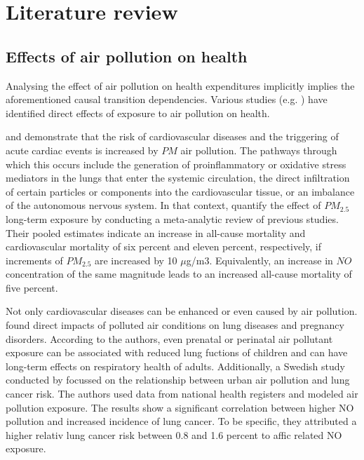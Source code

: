 \documentclass[
]{article}
\begin{document}
	\hypertarget{literature review}{%
		\section{Literature review}\label{Literature review}}
	
	\subsection{Effects of air pollution on health}
	
	Analysing the effect of air pollution on health expenditures implicitly implies the aforementioned causal transition dependencies. Various studies (e.g. \cite{franklin2015air,NYBERG2000,LEL2015}) have identified direct effects of exposure to air pollution on health. 
	
	\cite{franklin2015air} and \cite{fiordelisi2017mechanisms} demonstrate that the risk of cardiovascular diseases and the triggering of acute cardiac events is increased by $PM$ air pollution. The pathways through which this occurs include the generation of proinflammatory or oxidative stress mediators in the lungs that enter the systemic circulation, the direct infiltration of certain particles or components into the cardiovascular tissue, or an imbalance of the autonomous nervous system. In that context, \cite{hoek2013long} quantify the effect of $PM_2.5$ long-term exposure by conducting a meta-analytic review of previous studies. Their pooled estimates indicate an increase in all-cause mortality and cardiovascular mortality of six percent and eleven percent, respectively, if increments of $PM_2.5$ are increased by 10 $\mu$g/m3. Equivalently, an increase in $NO$ concentration of the same magnitude leads to an increased all-cause mortality of five percent.  
	
	Not only cardiovascular diseases can be enhanced or even caused by air pollution. \cite{KIM2018} found direct impacts of polluted air conditions on lung diseases and pregnancy disorders. According to the authors, even prenatal or perinatal air pollutant exposure can be associated with reduced lung fuctions of children and can have long-term effects on respiratory health of adults. Additionally, a Swedish study conducted by \cite{NYBERG2000} focussed on the relationship between urban air pollution and lung cancer risk. The authors used data from national health registers and modeled air pollution exposure. The results show a significant correlation between higher NO pollution and increased incidence of lung cancer. To be specific, they attributed a higher relativ lung cancer risk between 0.8 and 1.6 percent to affic related NO exposure. 
	
\end{document}
